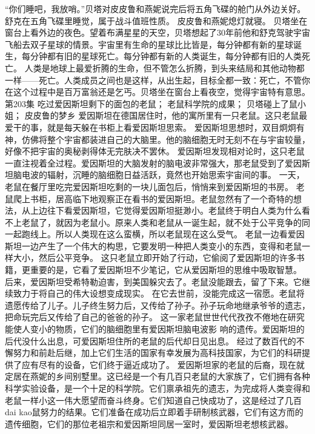 \documentclass[a4paper,12pt,UTF8,twoside]{ctexbook}
\begin{document}
        “你们睡吧，我放哨。”贝塔对皮皮鲁和燕妮说完后将五角飞碟的舱门从外边关好。  
        舒克在五角飞碟里睡觉，属于战斗值班性质。  
        皮皮鲁和燕妮熄灯就寝。  
        贝塔坐在窗台上看外边的夜色。望着布满星星的天空，贝塔想起了30年前他和舒克驾驶宇宙飞船去双子星球的情景。宇宙里有生命的星球比比皆是，每分钟都有新的星球诞生，每分钟都有旧的星球死亡。每分钟都有新的人类诞生，每分钟都有旧的人类死亡。  
        人类是地球上最爱折腾的生命，但不管怎么折腾，到头来结局和其他动物都一样——死亡。人类成员之间也是这样，从出生起，目标全都一致：死亡，不管你在这个过程中是百万富翁还是乞丐。贝塔坐在窗台上看夜空，觉得宇宙特有意思。          第203集  
        吃过爱因斯坦剩下的面包的老鼠；  
        老鼠科学院的成果；  
        贝塔碰上了鼠小姐；  
        皮皮鲁的梦乡    
        爱因斯坦在德国居住时，他的寓所里有一只老鼠。这只老鼠最爱干的事，就是每天躲在书柜上看爱因斯坦思索。  
        爱因斯坦思想时，双目炯炯有神，仿佛将整个宇宙都装进自己的大脑里。他的脑细胞无时无刻不在与宇宙较量，好像不把宇宙的奥秘剥得体无完肤决不罢休。  
        爱因斯坦发现相对论时，这只老鼠一直注视着全过程。爱因斯坦的大脑发射的脑电波非常强大，那老鼠受到了爱因斯坦脑电波的辐射，沉睡的脑细胞日益活跃，竟然也开始思索宇宙间的事。        
        一天，老鼠在餐厅里吃完爱因斯坦吃剩的一块儿面包后，悄悄来到爱因斯坦的书房。  
        老鼠爬上书柜，居高临下地观察正在看书的爱因斯坦。老鼠忽然有了一个奇特的想法，从上边往下看爱因斯坦，它觉得爱因斯坦挺渺小。老鼠终于明白人类为什么看不上老鼠了，就因为老鼠小。原来人类和老鼠从一诞生起，就不处于公平竞争的同一起跑线上。所以人类现在这么蛮横，所以老鼠现在这么受气。  
        老鼠一边看爱因斯坦一边产生了一个伟大的构思，它要发明一种把人类变小的东西，变得和老鼠一样大小，然后公平竞争。  
        这只老鼠立即开始了行动，它偷阅了爱因斯坦的许多书籍，更重要的是，它看了爱因斯坦不少笔记，它从爱因斯坦的思维中吸取智慧。  
        后来，爱因斯坦受希特勒迫害，到美国躲灾去了。老鼠没能跟去，留了下来。它继续致力于将自己的伟大设想变成现实。  
        在它去世前，没能完成这一宿愿。老鼠将遗愿传给了儿子。儿子终生努力后，又传给了孙子。孙子玩命地继承爷爷的遗志，把命玩完后又传给了自己的爸爸的孙子。  
        这一家老鼠世世代代孜孜不倦地在研究能使人变小的物质，它们的脑细胞里有爱因斯坦脑电波影        响的遗传。爱因斯坦的后代没什么出息，可爱因斯坦住所的老鼠的后代却日见出息。  
        经过了数百代的不懈努力和前赴后继，加上它们生活的国家有幸发展为高科技国家，为它们的科研提供了应有尽有的设备，它们终于逼近成功了。  
        爱因斯坦家的老鼠的后裔，现在就定居在燕妮的乡间别墅里。这已经是一个有几百只老鼠的大家族了，它们拥有各种科学实验设备，是一个十足的科学院。它们禀承祖先的遗志，为完成将人类变得和老鼠一样小这一伟大愿望而奋斗终身。它们知道自己快成功了，这是经过了几百dai kao鼠努力的结果。它们准备在成功后立即着手研制核武器，它们有这方而的遗传细胞，它们的那位老祖宗和爱因斯坦同居一室时，爱因斯坦老想核武器。  
\end{document}
